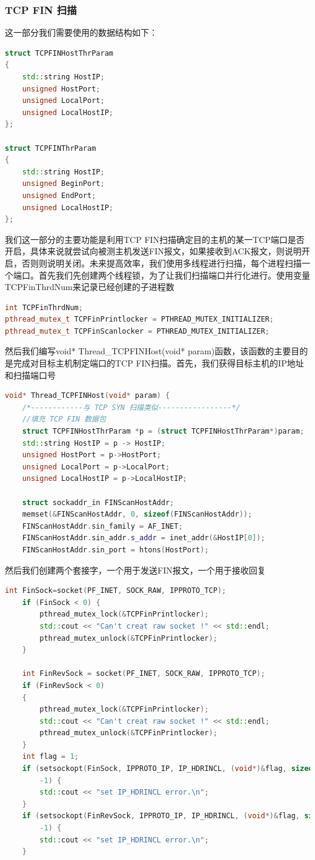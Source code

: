 \documentclass[UTF8,a4paper,10pt]{ctexart}
\begin{document}
\subsubsection{TCP FIN 扫描}
这一部分我们需要使用的数据结构如下：
\begin{lstlisting}[language = C++]
struct TCPFINHostThrParam
{
    std::string HostIP;
    unsigned HostPort;
    unsigned LocalPort;
    unsigned LocalHostIP;
};

struct TCPFINThrParam
{
	std::string HostIP;
	unsigned BeginPort;
	unsigned EndPort;
	unsigned LocalHostIP;
};
\end{lstlisting}
我们这一部分的主要功能是利用TCP FIN扫描确定目的主机的某一TCP端口是否开启，具体来说就尝试向被测主机发送FIN报文，如果接收到ACK报文，则说明开启，否则则说明关闭。未来提高效率，我们使用多线程进行扫描，每个进程扫描一个端口。首先我们先创建两个线程锁，为了让我们扫描端口并行化进行。使用变量TCPFinThrdNum来记录已经创建的子进程数
\begin{lstlisting}[language = C++]
int TCPFinThrdNum;
pthread_mutex_t TCPFinPrintlocker = PTHREAD_MUTEX_INITIALIZER;
pthread_mutex_t TCPFinScanlocker = PTHREAD_MUTEX_INITIALIZER;
\end{lstlisting}
然后我们编写void* Thread\_TCPFINHost(void* param)函数，该函数的主要目的是完成对目标主机制定端口的TCP FIN扫描。首先，我们获得目标主机的IP地址和扫描端口号
\begin{lstlisting}[language = C++]
void* Thread_TCPFINHost(void* param) {
    /*------------与 TCP SYN 扫描类似-----------------*/ 
    //填充 TCP FIN 数据包
    struct TCPFINHostThrParam *p = (struct TCPFINHostThrParam*)param;
    std::string HostIP = p -> HostIP;
	unsigned HostPort = p->HostPort;
	unsigned LocalPort = p->LocalPort;
	unsigned LocalHostIP = p->LocalHostIP;

    struct sockaddr_in FINScanHostAddr;
    memset(&FINScanHostAddr, 0, sizeof(FINScanHostAddr));
	FINScanHostAddr.sin_family = AF_INET;
	FINScanHostAddr.sin_addr.s_addr = inet_addr(&HostIP[0]);
	FINScanHostAddr.sin_port = htons(HostPort); 
\end{lstlisting}
然后我们创建两个套接字，一个用于发送FIN报文，一个用于接收回复
\begin{lstlisting}[language = C++]
    int FinSock=socket(PF_INET, SOCK_RAW, IPPROTO_TCP); 
	if (FinSock < 0) {
		pthread_mutex_lock(&TCPFinPrintlocker);
		std::cout << "Can't creat raw socket !" << std::endl;
		pthread_mutex_unlock(&TCPFinPrintlocker);
	}

    int FinRevSock = socket(PF_INET, SOCK_RAW, IPPROTO_TCP); 
	if (FinRevSock < 0) 
	{
		pthread_mutex_lock(&TCPFinPrintlocker);
		std::cout << "Can't creat raw socket !" << std::endl;
		pthread_mutex_unlock(&TCPFinPrintlocker);
	}
	int flag = 1;
    if (setsockopt(FinSock, IPPROTO_IP, IP_HDRINCL, (void*)&flag, sizeof(int)) ==
        -1) {
        std::cout << "set IP_HDRINCL error.\n";
    }
	if (setsockopt(FinRevSock, IPPROTO_IP, IP_HDRINCL, (void*)&flag, sizeof(int)) ==
        -1) {
        std::cout << "set IP_HDRINCL error.\n";
    }

\end{lstlisting}
\end{document}

